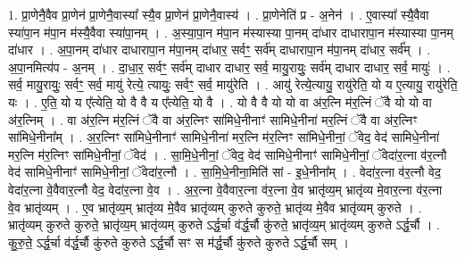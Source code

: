 \documentclass[17pt]{extarticle}
\begin{document}
1. प्रा॒णेनै॒वैव प्रा॒णेन॑ प्रा॒णेनै॒वास्या᳚ स्यै॒व प्रा॒णेन॑ प्रा॒णेनै॒वास्य॑ । . प्रा॒णेनेति॑ प्र - अ॒नेन॑ । . ए॒वास्या᳚ स्यै॒वैवा स्या॑पा॒न म॑पा॒न म॑स्यै॒वैवा स्या॑पा॒नम् । . अ॒स्या॒पा॒न म॑पा॒न म॑स्यास्या पा॒नम् दा॑धार दाधारापा॒न म॑स्यास्या पा॒नम् दा॑धार । . अ॒पा॒नम् दा॑धार दाधारापा॒न म॑पा॒नम् दा॑धार॒ सर्वꣳ॒॒ सर्व॑म् दाधारापा॒न म॑पा॒नम् दा॑धार॒ सर्व᳚म् । . अ॒पा॒नमित्य॑प - अ॒नम् । . दा॒धा॒र॒ सर्वꣳ॒॒ सर्व॑म् दाधार दाधार॒ सर्व॒ मायु॒रायुः॒ सर्व॑म् दाधार दाधार॒ सर्व॒ मायुः॑ । . सर्व॒ मायु॒रायुः॒ सर्वꣳ॒॒ सर्व॒ मायु॑ रेत्ये॒ त्यायुः॒ सर्वꣳ॒॒ सर्व॒ मायु॑रेति । . आयु॑ रेत्ये॒त्यायु॒ रायु॑रेति॒ यो य ए॒त्यायु॒ रायु॑रेति॒ यः । . ए॒ति॒ यो य ए᳚त्येति॒ यो वै वै य ए᳚त्येति॒ यो वै । . यो वै वै यो यो वा अ॑र॒त्नि म॑र॒त्निं ॅवै यो यो वा अ॑र॒त्निम् । . वा अ॑र॒त्नि म॑र॒त्निं ॅवै वा अ॑र॒त्निꣳ सा॑मिधे॒नीनाꣳ॑ सामिधे॒नीना॑ मर॒त्निं ॅवै वा अ॑र॒त्निꣳ सा॑मिधे॒नीना᳚म् । . अ॒र॒त्निꣳ सा॑मिधे॒नीनाꣳ॑ सामिधे॒नीना॑ मर॒त्नि म॑र॒त्निꣳ सा॑मिधे॒नीनां॒ ॅवेद॒ वेद॑ सामिधे॒नीना॑ मर॒त्नि म॑र॒त्निꣳ सा॑मिधे॒नीनां॒ ॅवेद॑ । . सा॒मि॒धे॒नीनां॒ ॅवेद॒ वेद॑ सामिधे॒नीनाꣳ॑ सामिधे॒नीनां॒ ॅवेदा॑र॒त्ना व॑र॒त्नौ वेद॑ सामिधे॒नीनाꣳ॑ सामिधे॒नीनां॒ ॅवेदा॑र॒त्नौ । . सा॒मि॒धे॒नीना॒मिति॑ सां - इ॒धे॒नीना᳚म् । . वेदा॑र॒त्ना व॑र॒त्नौ वेद॒ वेदा॑र॒त्ना वे॒वैवार॒त्नौ वेद॒ वेदा॑र॒त्ना वे॒व । . अ॒र॒त्ना वे॒वैवार॒त्ना व॑र॒त्ना वे॒व भ्रातृ॑व्य॒म् भ्रातृ॑व्य मे॒वार॒त्ना व॑र॒त्ना वे॒व भ्रातृ॑व्यम् । . ए॒व भ्रातृ॑व्य॒म् भ्रातृ॑व्य मे॒वैव भ्रातृ॑व्यम् कुरुते कुरुते॒ भ्रातृ॑व्य मे॒वैव भ्रातृ॑व्यम् कुरुते । . भ्रातृ॑व्यम् कुरुते कुरुते॒ भ्रातृ॑व्य॒म् भ्रातृ॑व्यम् कुरुते ऽर्द्ध॒र्चा व॑र्द्ध॒र्चौ कु॑रुते॒ भ्रातृ॑व्य॒म् भ्रातृ॑व्यम् कुरुते ऽर्द्ध॒र्चौ । . कु॒रु॒ते॒ ऽर्द्ध॒र्चा व॑र्द्ध॒र्चौ कु॑रुते कुरुते ऽर्द्ध॒र्चौ सꣳ स म॑र्द्ध॒र्चौ कु॑रुते कुरुते ऽर्द्ध॒र्चौ सम् । \newline
\end{document}
